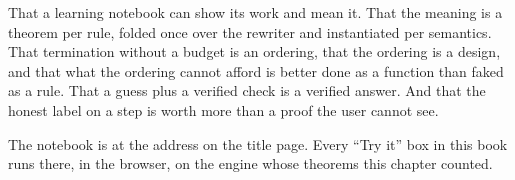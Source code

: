 That a learning notebook can show its work and mean it. That the meaning is a theorem per rule,
folded once over the rewriter and instantiated per semantics. That termination without a budget
is an ordering, that the ordering is a design, and that what the ordering cannot afford is better
done as a function than faked as a rule. That a guess plus a verified check is a verified
answer. And that the honest label on a step is worth more than a proof the user cannot see.

The notebook is at the address on the title page. Every ``Try it'' box in this book runs there,
in the browser, on the engine whose theorems this chapter counted.
